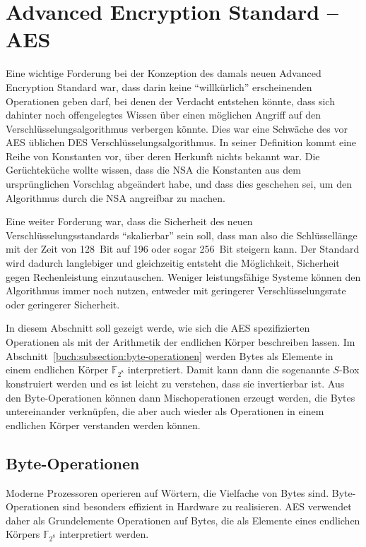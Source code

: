 %
%
%
\section{Advanced Encryption Standard -- AES
\label{buch:section:aes}}
Eine wichtige Forderung bei der Konzeption des damals neuen
Advanced Encryption Standard war, dass darin keine ``willkürlich''
erscheinenden Operationen geben darf, bei denen der Verdacht
entstehen könnte, dass sich dahinter noch offengelegtes Wissen
über einen möglichen Angriff auf den Verschlüsselungsalgorithmus
verbergen könnte.
Dies war eine Schwäche des vor AES üblichen DES Verschlüsselungsalgorithmus.
In seiner Definition kommt eine Reihe von Konstanten vor, über deren
Herkunft nichts bekannt war.
Die Gerüchteküche wollte wissen, dass die NSA die Konstanten aus dem
ursprünglichen Vorschlag abgeändert habe, und dass dies geschehen sei,
um den Algorithmus durch die NSA angreifbar zu machen.

Eine weiter Forderung war, dass die Sicherheit des neuen
Verschlüsselungsstandards ``skalierbar'' sein soll, dass man also
die Schlüssellänge mit der Zeit von 128~Bit auf 196 oder sogar 256~Bit
steigern kann.
Der Standard wird dadurch langlebiger und gleichzeitig entsteht die
Möglichkeit, Sicherheit gegen Rechenleistung einzutauschen.
Weniger leistungsfähige Systeme können den Algorithmus immer noch
nutzen, entweder mit geringerer Verschlüsselungsrate oder geringerer
Sicherheit.

In diesem Abschnitt soll gezeigt werde, wie sich die AES
spezifizierten Operationen als mit der Arithmetik der
endlichen Körper beschreiben lassen.
Im Abschnitt~\ref{buch:subsection:byte-operationen} werden
Bytes als Elemente in einem endlichen Körper $\mathbb{F}_{2^8}$
interpretiert.
Damit kann dann die sogenannte $S$-Box konstruiert werden und
es ist leicht zu verstehen, dass sie invertierbar ist.
Aus den Byte-Operationen können dann Mischoperationen erzeugt
werden, die Bytes untereinander verknüpfen, die aber auch wieder
als Operationen in einem endlichen Körper verstanden werden können.

\subsection{Byte-Operationen
\label{buch:subsection:byte-operationen}}
Moderne Prozessoren operieren auf Wörtern, die Vielfache von Bytes sind.
Byte-Operationen sind besonders effizient in Hardware zu realisieren.
AES verwendet daher als Grundelemente Operationen auf Bytes, die als
Elemente eines endlichen Körpers $\mathbb{F}_{2^8}$ interpretiert werden.

